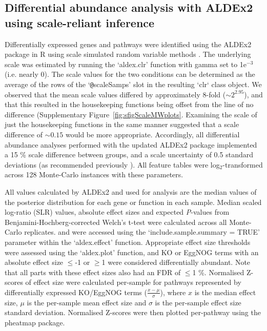 \documentclass[sn-mathphys,Numbered]{sn-jnl}%
\begin{document}
\subsection{Differential abundance analysis with ALDEx2 using scale-reliant inference}
Differentially expressed genes and pathways were identified using the ALDEx2 package in R using scale simulated random variable methods \cite{fernandes:2013, gloorScale, nixon2023scale}. The underlying scale was estimated by running the `aldex.clr' function with gamma set to 1e$^{-3}$ (i.e. nearly 0). The scale values for the two conditions can be determined as the average of the rows of the `\texttt{@}scaleSamps' slot in the resulting `clr` class object. We observed that the mean scale values differed by approximately 8-fold ($\sim 2^{2.95}$), and that this resulted in the housekeeping functions being offset from the line of no difference (Supplementary Figure~\ref{fig:sfigScaleMWplots}. Examining the scale of just the housekeeping functions in the same manner suggested that a scale difference of $\sim0.15$ would be more appropriate. Accordingly, all differential abundance analyses performed with the updated ALDEx2 package implemented a 15 \% scale difference between groups, and a scale uncertainty of 0.5 standard deviations (as recommended previously \citep{gloorScale, nixon2023scale}). All feature tables were log$_2$-transformed across 128 Monte-Carlo instances with these parameters.

All values calculated by ALDEx2 and used for analysis are the median values of the posterior distribution for each gene or function in each sample. Median scaled log-ratio (SLR) values, absolute effect sizes and expected \textit{P}-values from Benjamini-Hochberg-corrected Welch's t-test were calculated across all Monte-Carlo replicates. and were accessed using the `include.sample.summary = TRUE' parameter within the `aldex.effect' function. Appropriate effect size thresholds were assessed using the `aldex.plot' function, and KO or EggNOG terms with an absolute effect size $\leq$-1 or $\geq$1 were considered differentially abundant. Note that all parts with these effect sizes also had an FDR of $\leq$1 \%. Normalised Z-scores of effect size were calculated per-sample for pathways represented by differentially expressed KO/EggNOG terms ($\frac{x-\mu}{\sigma}$), where $x$ is the median effect size, $\mu$ is the per-sample mean effect size and $\sigma$ is the per-sample effect size standard deviation. Normalised Z-scores were then plotted per-pathway using the pheatmap package.
\end{document}
